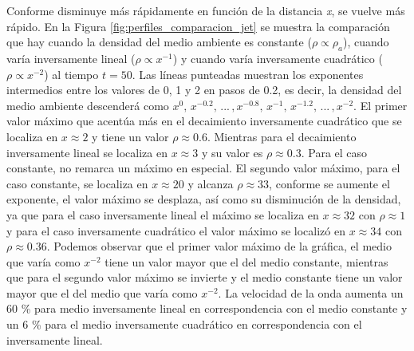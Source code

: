 \documentclass[12pt,a4paper]{book}
\begin{document}
Conforme disminuye más rápidamente en función de la distancia \emph{x}, 
se vuelve más rápido. En la Figura \ref{fig:perfiles_comparacion_jet} se muestra la comparación que hay cuando la densidad del medio ambiente es constante ($\rho \varpropto \rho_a$), 
cuando varía inversamente lineal ($\rho \varpropto x^{-1}$) y cuando varía inversamente cuadrático ($\rho \varpropto x^{-2}$) al tiempo $t = 50$. Las líneas punteadas muestran los exponentes intermedios 
entre los valores de 0, 1 y 2 en pasos de 0.2, es decir, la densidad del medio ambiente descenderá como $x^0, \, x^{-0.2}, \, . . . \,  ,x^{-0.8} , \, x^{-1}  , \, x^{-1.2}, \, . . . \,  , x^{-2}$. El primer 
valor máximo que acentúa más en el decaimiento inversamente cuadrático que se localiza en $x \approx 2$ y tiene un valor $\rho \approx 0.6$. Mientras para el decaimiento inversamente lineal se localiza en 
$x \approx 3$ y su valor es $\rho  \approx  0.3$. Para el caso constante, no remarca un máximo en especial. El segundo valor máximo, para el caso constante, se localiza en $x \approx 20$ y alcanza $\rho  \approx 33$, 
conforme se aumente el exponente, el valor máximo se desplaza, así como su disminución de la densidad, ya que para el caso inversamente lineal el máximo se localiza en $x \approx 32$ con $\rho \approx 1$ y para el 
caso inversamente cuadrático el valor máximo se localizó en $x \approx 34$ con $\rho \approx 0.36 $.  Podemos observar que el primer valor máximo de la gráfica, el medio que varía como $x^{-2}$ tiene un valor mayor 
que el del medio constante, mientras que para el segundo valor máximo se invierte y el medio constante tiene un valor mayor que el del medio que varía como $x^{-2}$. La velocidad de la onda aumenta un 60 \% para 
medio inversamente lineal en correspondencia con el medio constante y un 6 \% para el medio inversamente cuadrático en correspondencia con el inversamente lineal.  
\end{document}
